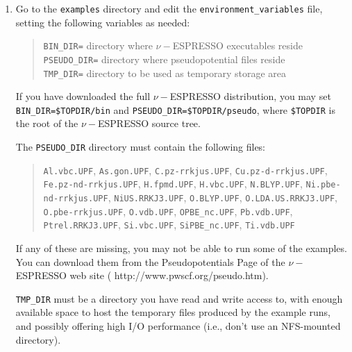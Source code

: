 \documentclass[12pt,a4paper]{article}
\begin{document}
\begin{enumerate}
  \item
Go to the \texttt{examples} directory and edit the
\texttt{environment\_variables} file, setting the following variables
as needed:
\begin{quote}
  \texttt{BIN\_DIR=} directory where $\nu-$ESPRESSO executables reside\\
  \texttt{PSEUDO\_DIR=} directory where pseudopotential files reside\\
  \texttt{TMP\_DIR=} directory to be used as temporary storage area
\end{quote}
If you have downloaded the full $\nu-$ESPRESSO distribution, you may set
\texttt{BIN\_DIR=\$TOPDIR/bin} and
\texttt{PSEUDO\_DIR=\$TOPDIR/pseudo}, where \texttt{\$TOPDIR} is the
root of the $\nu-$ESPRESSO source tree.

The \texttt{PSEUDO\_DIR} directory must contain the following files:    
\begin{quote}
  \begin{flushleft}
%
%
    \texttt{Al.vbc.UPF},
    \texttt{As.gon.UPF},
    \texttt{C.pz-rrkjus.UPF},
    \texttt{Cu.pz-d-rrkjus.UPF},
    \texttt{Fe.pz-nd-rrkjus.UPF},
    \texttt{H.fpmd.UPF},
    \texttt{H.vbc.UPF},
    \texttt{N.BLYP.UPF},
    \texttt{Ni.pbe-nd-rrkjus.UPF},
    \texttt{NiUS.RRKJ3.UPF},
    \texttt{O.BLYP.UPF},
    \texttt{O.LDA.US.RRKJ3.UPF},
    \texttt{O.pbe-rrkjus.UPF},
    \texttt{O.vdb.UPF},
    \texttt{OPBE\_nc.UPF},
    \texttt{Pb.vdb.UPF},
    \texttt{Ptrel.RRKJ3.UPF},
    \texttt{Si.vbc.UPF},
    \texttt{SiPBE\_nc.UPF},
    \texttt{Ti.vdb.UPF}
  \end{flushleft}
\end{quote}

If any of these are missing, you may not be able to run some of the
examples.  You can download them from the Pseudopotentials Page of the
$\nu-$ESPRESSO web site
(%
                   {http://www.pwscf.org/pseudo.htm}).

\texttt{TMP\_DIR} must be a directory you have read and write access
to, with enough available space to host the temporary files produced
by the example runs, and possibly offering high I/O performance (i.e.,
don't use an NFS-mounted directory).


\end{enumerate}
\end{document}
